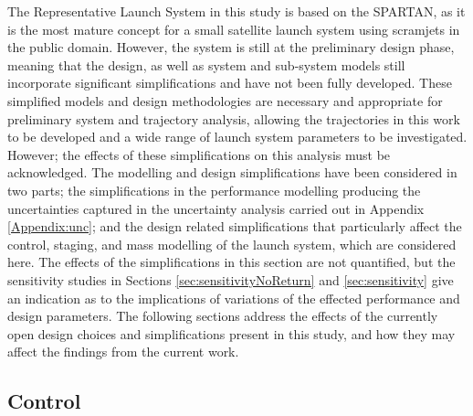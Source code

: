 \noindent
The Representative Launch System in this study is based on the SPARTAN\cite{Preller2017b}, as it is the most mature concept for a small satellite launch system using scramjets in the public domain. However, the system is still at the preliminary design phase, meaning that the design, as well as system and sub-system models still incorporate significant simplifications and have not been fully developed. These simplified models and design methodologies are necessary and appropriate for preliminary system and trajectory analysis, allowing the trajectories in this work to be developed and a wide range of launch system parameters to be investigated. However; the effects of these simplifications on this analysis must be acknowledged.
The modelling and design simplifications have been considered in two parts; the simplifications in the performance modelling producing the uncertainties captured in the uncertainty analysis carried out in Appendix \ref{Appendix:unc}; and the design related simplifications that particularly affect the control, staging, and mass modelling of the launch system, which are considered here. The effects of the simplifications in this section are not quantified, but the sensitivity studies in Sections \ref{sec:sensitivityNoReturn} and \ref{sec:sensitivity} give an indication as to the implications of variations of the effected performance and design parameters.
The following sections address the effects of the currently open design choices and simplifications present in this study, and how they may affect the findings from the current work. 

\subsection{Control}
